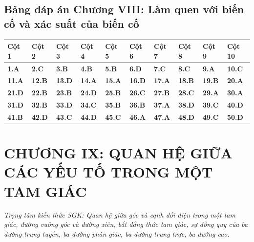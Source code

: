 \documentclass[11pt,a4paper]{article}
\begin{document}
\subsection*{\color{primary} Bảng đáp án Chương VIII: Làm quen với biến cố và xác suất của biến cố}
\begin{center}
\renewcommand{\arraystretch}{1.25}
\begin{tabularx}{\textwidth}{*{10}{>{\centering\arraybackslash}X}}
\toprule
\textbf{\color{primary} Cột 1} & \textbf{\color{primary} Cột 2} & \textbf{\color{primary} Cột 3} & \textbf{\color{primary} Cột 4} & \textbf{\color{primary} Cột 5} & \textbf{\color{primary} Cột 6} & \textbf{\color{primary} Cột 7} & \textbf{\color{primary} Cột 8} & \textbf{\color{primary} Cột 9} & \textbf{\color{primary} Cột 10} \\
\midrule
\textbf{1.A} & \textbf{2.C} & \textbf{3.B} & \textbf{4.B} & \textbf{5.B} & \textbf{6.D} & \textbf{7.C} & \textbf{8.C} & \textbf{9.A} & \textbf{10.C} \\
\rowcolor{rowtint} \textbf{11.A} & \textbf{12.B} & \textbf{13.D} & \textbf{14.A} & \textbf{15.A} & \textbf{16.D} & \textbf{17.A} & \textbf{18.B} & \textbf{19.B} & \textbf{20.A} \\
\textbf{21.D} & \textbf{22.B} & \textbf{23.B} & \textbf{24.D} & \textbf{25.B} & \textbf{26.C} & \textbf{27.B} & \textbf{28.C} & \textbf{29.A} & \textbf{30.A} \\
\rowcolor{rowtint} \textbf{31.D} & \textbf{32.B} & \textbf{33.D} & \textbf{34.C} & \textbf{35.B} & \textbf{36.B} & \textbf{37.A} & \textbf{38.D} & \textbf{39.C} & \textbf{40.D} \\
\textbf{41.B} & \textbf{42.D} & \textbf{43.C} & \textbf{44.D} & \textbf{45.C} & \textbf{46.A} & \textbf{47.A} & \textbf{48.D} & \textbf{49.C} & \textbf{50.D} \\
\bottomrule
\end{tabularx}
\end{center}\vspace{10pt}
\section*{\color{primary} CHƯƠNG IX: QUAN HỆ GIỮA CÁC YẾU TỐ TRONG MỘT TAM GIÁC}
\textit{Trọng tâm kiến thức SGK: Quan hệ giữa góc và cạnh đối diện trong một tam giác, đường vuông góc và đường xiên, bất đẳng thức tam giác, sự đồng quy của ba đường trung tuyến, ba đường phân giác, ba đường trung trực, ba đường cao.}\par\vspace{4pt}
\end{document}

